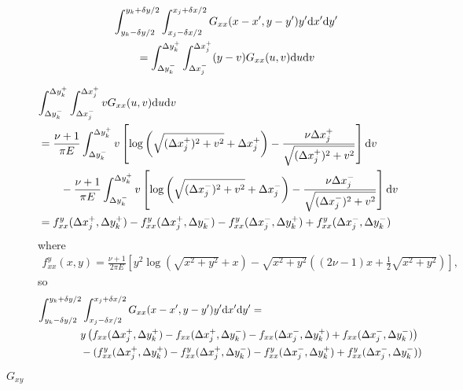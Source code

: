 \documentclass{article}
\newcommand{\dd}{\mathrm{d}}
\begin{document}
\begin{description}
\begin{align}
\lefteqn{\int_{y_k-\delta y/2}^{y_k+\delta y/2}  \int_{x_j-\delta x/2}^{x_j+\delta x/2} G_{xx}(x-x',y-y')y'\dd x'  \dd y'}\nonumber\\
&\qquad =\int_{\Delta y_{k}^-}^{\Delta y_k^+}  \int_{\Delta x_j^-}^{\Delta x_j^+}(y-v) G_{xx}(u,v)\dd u \dd v 
\end{align}

\begin{align}
\lefteqn{ \int_{\Delta y_{k}^-}^{\Delta y_k^+}  \int_{\Delta x_j^-}^{\Delta x_j^+}v G_{xx}(u,v)\dd u \dd v  } \nonumber\\
&= \frac{\nu+1}{\pi E} \int_{\Delta y_{k}^-}^{\Delta y_k^+} v\left[ \log\left( \sqrt{(\Delta x_j^+)^2 + v^2 }+\Delta x_j^+ \right) -\frac{\nu \Delta x_j^+}{\sqrt{(\Delta x_j^+)^2+v^2}}\right]\dd v \nonumber \\
&\qquad-\frac{\nu+1}{\pi E} \int_{\Delta y_{k}^-}^{\Delta y_k^+} v\left[ \log\left( \sqrt{(\Delta x_j^-)^2 + v^2 }+\Delta x_j^- \right) -\frac{\nu \Delta x_j^-}{\sqrt{(\Delta x_j^-)^2+v^2}}\right]\dd v \nonumber\\
&= f^y_{xx}(\Delta x_j^+,\Delta y_k^+) - f^y_{xx}(\Delta x_j^+,\Delta y_k^-) - f^y_{xx}(\Delta x_j^-,\Delta y_k^+) + f^y_{xx}(\Delta x_j^-,\Delta y_k^-) 
\end{align}
where
\begin{align}
f^y_{xx}(x,y) =\frac{\nu+1}{2\pi E} \left[y^2\log\left(\sqrt{x^2+y^2}+x \right) - \sqrt{x^2+y^2}\left((2\nu-1)x + \frac{1}{2}\sqrt{x^2+y^2} \right)  \right],
\end{align}
so
\begin{align}
\lefteqn{\int_{y_k-\delta y/2}^{y_k+\delta y/2}  \int_{x_j-\delta x/2}^{x_j+\delta x/2} G_{xx}(x-x',y-y')y'\dd x'  \dd y' =} \nonumber\\
&\qquad\qquad  y\left(f_{xx}( \Delta x_j^+,\Delta y_k^+) - f_{xx}( \Delta x_j^+,\Delta y_k^-) -f_{xx}(\Delta x_j^-, \Delta y_k^+) + f_{xx}(\Delta x_j^- , \Delta y_k^-)  \right) \nonumber\\
&\qquad\qquad - ( f^y_{xx}(\Delta x_j^+,\Delta y_k^+) - f^y_{xx}(\Delta x_j^+,\Delta y_k^-) - f^y_{xx}(\Delta x_j^-,\Delta y_k^+) + f^y_{xx}(\Delta x_j^-,\Delta y_k^-)  )
\end{align}


\item[$G_{xy}$]


\end{description}
\end{document}
